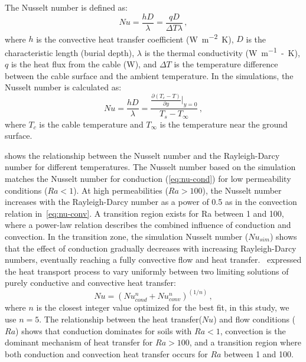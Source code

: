 \documentclass[Journal,letterpaper,InsideFigs]{ascelike-new}
\begin{document}
The Nusselt number is defined as: 
\begin{equation}
Nu = \frac{hD}{\lambda}  = \frac{qD}{\Delta T \lambda}\,,
\end{equation}
where $h$ is the convective heat transfer coefficient (\si{\watt\per\meter\squared\kelvin}), $D$ is the characteristic length (burial depth), $\lambda$ is the thermal conductivity (\si{\watt\per\meter-\kelvin}), $q$ is the heat flux from the cable (\si{\watt}), and $\Delta T$ is the temperature difference between the cable surface and the ambient temperature. In the simulations, the Nusselt number is calculated as: 
\begin{equation}
Nu = \frac{hD}{\lambda} =  \frac{\frac{\partial (T_c - T)}{\partial y}|_{y=0}}{T_s -T_\infty}\,,
\end{equation}
where $T_c$ is the cable temperature and $T_\infty$ is the temperature near the ground surface. 

 shows the relationship between the Nusselt number and the Rayleigh-Darcy number for different temperatures. The Nusselt number based on the simulation matches the Nusselt number for conduction (\cref{eq:nu-cond}) for low permeability conditions ($Ra < 1$). At high permeabilities ($Ra > 100$), the Nusselt number increases with the Rayleigh-Darcy number as a power of 0.5 as in the convection relation in~\cref{eq:nu-conv}. A transition region exists for Ra between 1 and 100, where a power-law relation describes the combined influence of conduction and convection. In the transition zone, the simulation Nusselt number ($Nu_{sim}$) shows that the effect of conduction gradually decreases with increasing Rayleigh-Darcy numbers, eventually reaching a fully convective flow and heat transfer.~ expressed the heat transport process to vary uniformly between two limiting solutions of purely conductive and convective heat transfer:
\begin{equation}
    Nu = (Nu_{cond}^n + Nu_{conv}^n)^{(1/n)} \,,
\end{equation}
where $n$ is the closest integer value optimized for the best fit, in this study, we use $n = 5$.  The relationship between the heat transfer($Nu$) and flow conditions ($Ra$) shows that conduction dominates for soils with $Ra < 1$, convection is the dominant mechanism of heat transfer for $Ra > 100$, and a transition region where both conduction and convection heat transfer occurs for $Ra$ between 1 and 100.
\end{document}

